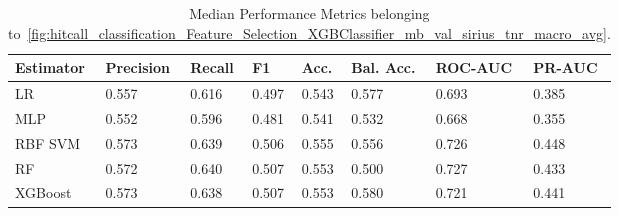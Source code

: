 \begin{longtable}{llllllll}
\caption{Median Performance Metrics belonging to~\ref{fig:hitcall_classification_Feature_Selection_XGBClassifier_mb_val_sirius_tnr_macro_avg}.}\label{tab:table:hitcall_classification_feature_selection_xgbclassifier_mb_val_sirius_tnr_macro_avg}\\
\toprule
\midrule
\small Estimator & \small Precision & \small Recall & \small F1 & \small Acc. & \small Bal. Acc. & \small ROC-AUC & \small PR-AUC\\
\hline
LR & 0.557 & 0.616 & 0.497 & 0.543 & 0.577 & 0.693 & 0.385\\
MLP & 0.552 & 0.596 & 0.481 & 0.541 & 0.532 & 0.668 & 0.355\\
RBF SVM & 0.573 & 0.639 & 0.506 & 0.555 & 0.556 & 0.726 & 0.448\\
RF & 0.572 & 0.640 & 0.507 & 0.553 & 0.500 & 0.727 & 0.433\\
XGBoost & 0.573 & 0.638 & 0.507 & 0.553 & 0.580 & 0.721 & 0.441\\
\bottomrule
\end{longtable}